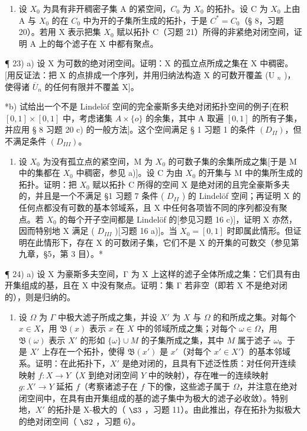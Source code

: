 \begin{enumerate}
\def\labelenumi{\alph{enumi})}
\setcounter{enumi}{1}
\tightlist
\item
  设 \(X_{0}\) 为具有非开稠密子集 A 的紧空间，\(C_{0}\) 为 \(X_{0}\) 的拓扑。设 C 为 \(X_{0}\) 上由 A 与 \(X_{0}\) 的在 \(C_{0}\) 中为开的子集所生成的拓扑，于是 \(C^{*} = C_{0}\)（§ 8，习题 20）。若用 X 表示把集 \(X_{0}\) 赋以拓扑 C（习题 21）所得的非紧绝对闭空间，证明 A 上的每个滤子在 X 中都有聚点。
\end{enumerate}

¶ 23) a) 设 X 为可数的绝对闭空间。证明：X 的孤立点所成之集在 X 中稠密。{[}用反证法：把 X 的点排成一个序列，并用归纳法构造 X 的可数开覆盖 (U \(_{n}\) )，使得诸 \(\overline{U}_{n}\) 的任何有限并不覆盖 X{]}。

*b) 试给出一个不是 Lindelöf 空间的完全豪斯多夫绝对闭拓扑空间的例子{[}在积 \([0,1]\times[0,1]\) 中，考虑诸集 \(A\times\{o\}\) 的余集，其中 A 取遍 \([0,1]\) 的所有子集，并应用 § 8 习题 20 c) 的一般方法{]}。这个空间满足 § 1 习题 1 的条件 \((D_{II})\)，但不满足条件 \((D_{III})\)。

\begin{enumerate}
\def\labelenumi{\alph{enumi})}
\setcounter{enumi}{2}
\tightlist
\item
  设 \(X_{0}\) 为没有孤立点的紧空间，M 为 \(X_{0}\) 的可数子集的余集所成之集{[}于是 M 中的集都在 \(X_{0}\) 中稠密，参见 a){]}。设 C 为由 \(X_{0}\) 的开集与 M 中的集所生成的拓扑。证明：把 \(X_{0}\) 赋以拓扑 C 所得的空间 X 是绝对闭的且完全豪斯多夫的，并且是一个不满足 §1 习题 7 条件 ( \(D_{II}\) ) 的 Lindelöf 空间；再证明 X 的任何点都没有可数的基本邻域系，且 X 中任何各项皆不同的序列都没有聚点。若 \(X_{0}\) 的每个开子空间都是 Lindelöf 的{[}参见习题 16 c){]}，证明 X 亦然，因而特别地 X 满足 ( \(D_{III}\) ){[}习题 16 a){]}。当 \(X_{0} = [0,1]\) 时即属此情形。但证明在此情形下，存在 X 的可数闭子集，它们不是 X 的开集的可数交（参见第九章，§5，第 3 目）。*
\end{enumerate}

¶ 24) a) 设 X 为豪斯多夫空间，Γ 为 X 上这样的滤子全体所成之集：它们具有由开集组成的基，且在 X 中没有聚点。证明：集 Γ 若非空（即若 X 不是绝对闭的），则是归纳的。

\begin{enumerate}
\def\labelenumi{\alph{enumi})}
\setcounter{enumi}{1}
\tightlist
\item
  设 \(\Omega\) 为 \(\Gamma\) 中极大滤子所成之集，并设 \(X'\) 为 \(X\) 与 \(\Omega\) 的和所成之集。对每个 \(x \in X\)，用 \(\mathfrak{B}(x)\) 表示 \(x\) 在 \(X\) 中的邻域所成之集；对每个 \(\omega \in \Omega\)，用 \(\mathfrak{B}(\omega)\) 表示 \(X'\) 的形如 \(\{\omega\} \cup M\) 的子集所成之集，其中 \(M\) 属于滤子 \(\omega\)。于是 \(X'\) 上存在一个拓扑，使得 \(\mathfrak{B}(x')\) 是 \(x'\)（对每个 \(x' \in X'\)）的基本邻域系。证明：在此拓扑下，\(X'\) 是绝对闭的，且具有下述泛性质：对任何开连续映射 \(f: X \to Y\)（\(X\) 到绝对闭空间 \(Y\) 中的映射），存在唯一的连续映射 \(g: X' \to Y\) 延拓 \(f\)（考察诸滤子在 \(f\) 下的像，这些滤子属于 \(\Omega\)，并注意在绝对闭空间中，在具有由开集组成的基的滤子集中为极大的滤子必收敛）。特别地，\(X'\) 的拓扑是 X-极大的（ \(\S 3\) ，习题 11）。由此推出，存在拓扑为拟极大的绝对闭空间（ \(\S 2\) ，习题 6）。
\end{enumerate}


